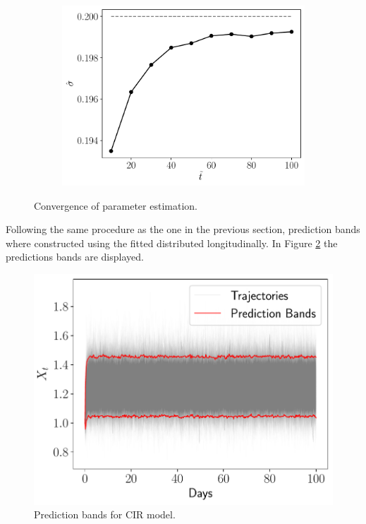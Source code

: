 \documentclass[11pt]{article}
\theoremstyle{definition}
\theoremstyle{remark}
\theoremstyle{remark}
\begin{document}
\begin{figure}
\begin{subfigure}[b]{0.45\textwidth}
      \includegraphics[scale=0.45]{sigmas.pdf}
      \caption{}
  \end{subfigure}
  \caption{Convergence of parameter estimation.}
  \label{fig:conv_param}
\end{figure}

Following the same procedure as the one in the previous section,
prediction bands where constructed using the fitted distributed
longitudinally. In Figure \ref{fig:bands2} the predictions bands are
displayed.

\begin{figure}
  \centering
  \includegraphics[scale=.5]{prediction_bands_2}
  \caption{Prediction bands for CIR model.}
  \label{fig:bands2}
\end{figure}
\end{document}
